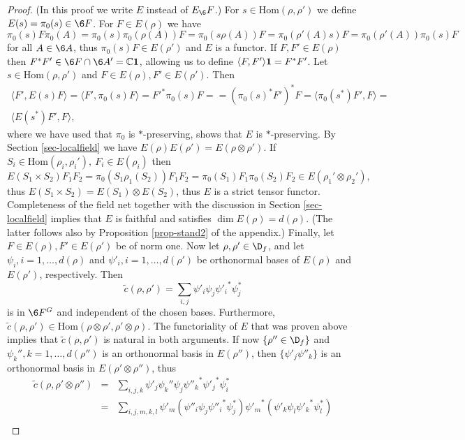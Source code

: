 \documentclass[12pt]{article}
\theoremstyle{definition}
\theoremstyle{definition}
\theoremstyle{remark}
\def\7#1{{\mathbb #1}}
\def\1#1{{\bf #1}}
\newcommand{\Hom}{\mathrm{Hom}}
\begin{document}
\begin{proof} (In this proof we write $E$ instead of $E_\6F$.) For $s\in\Hom(\rho,\rho')$ we define
$E(s)=\pi_0(s)\in\6F$. For $F\in E(\rho)$ we have  
$\pi_0(s)F\pi_0(A)=\pi_0(s)\pi_0(\rho(A))F=\pi_0(s\rho(A))F=\pi_0(\rho'(A)s)F=\pi_0(\rho'(A))\pi_0(s)F$
for all $A\in\6A$, thus $\pi_0(s)F\in E(\rho')$ and $E$ is a functor. If $F,F'\in E(\rho)$ then
$F^*F'\in\6F\cap\6A'=\7C\11$, allowing us to define $\langle F,F'\rangle\11=F^*F'$.
Let $s\in\Hom(\rho,\rho')$ and $F\in E(\rho),F'\in E(\rho')$. Then 
\begin{multline*}
 \langle F',E(s)F\rangle=\langle F',\pi_0(s)F\rangle={F'}^*\pi_0(s)F=
  =(\pi_0(s)^*F')^*F =\langle\pi_0(s^*)F',F\rangle= \\
  \langle E(s^*)F',F\rangle,
\end{multline*}
where we have used that $\pi_0$ is $*$-preserving, shows that $E$ is $*$-preserving.
By Section \ref{sec-localfield} we have $E(\rho)E(\rho')=E(\rho\otimes\rho')$. If
$S_i\in\Hom(\rho_i,\rho_i'), \ F_i\in E(\rho_i)$ then 
\[ E(S_1\times
S_2)F_1F_2=\pi_0(S_1\rho_1(S_2))F_1F_2=\pi_0(S_1)F_1\pi_0(S_2)F_2
\in E(\rho_1'\otimes\rho_2'), \] thus $E(S_1\times
S_2)=E(S_1)\otimes E(S_2)$, thus $E$ is a strict tensor
functor.  Completeness of the field net together with
the discussion in Section \ref{sec-localfield} implies
that $E$ is faithful and satisfies $\dim
E(\rho)=d(\rho)$. (The latter follows also by
Proposition \ref{prop-stand2} of the appendix.)
Finally, let $F\in E(\rho), F'\in E(\rho')$ be of norm
one. Now let $\rho,\rho'\in\D_f$, and let $\psi_i,
i=1,\ldots,d(\rho)$ and $\psi'_i, i=1,\ldots,d(\rho')$
be orthonormal bases of $E(\rho)$ and $E(\rho')$,
respectively. Then
\[ \tilde{c}(\rho,\rho')=\sum_{i,j}\psi'_i\psi_j{\psi'_i}^*\psi_j^* \]
is in $\6F^G$ and independent of the chosen bases. Furthermore,
$\tilde{c}(\rho,\rho')\in\Hom(\rho\otimes\rho',\rho'\otimes\rho)$. The functoriality of $E$ that was
proven above implies that $\tilde{c}(\rho,\rho')$ is natural in both arguments. If now
$\{\rho''\in\D_f\}$ and $\psi_k'', k=1,\ldots,d(\rho'')$ is an orthonormal basis in $E(\rho'')$,
then $\{\psi'_j\psi''_k\}$ is an orthonormal  basis in $E(\rho'\otimes\rho'')$, thus 
\begin{eqnarray*}
  \tilde{c}(\rho,\rho'\otimes\rho'')&=&
\sum_{i,j,k}\psi'_j\psi_k''\psi_j{\psi''_k}^*{\psi'_j}^*\psi_i^* \\
  &=&\sum_{i,j,m,k,l} \psi'_m (\psi''_i\psi_j{\psi''_i}^*\psi_j^*) {\psi'_m}^*
    (\psi'_k\psi_l{\psi'_k}^*\psi_l^*) \\

\end{eqnarray*}
\end{proof}
\end{document}
